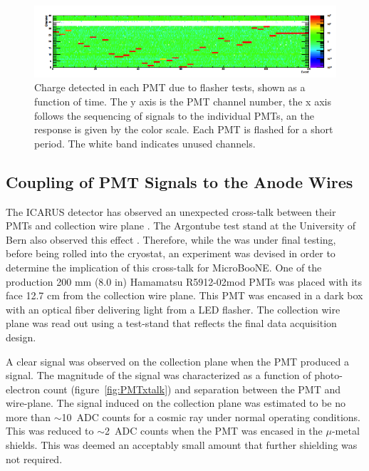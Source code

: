 \begin{figure}
\centering 
\includegraphics[width=\textwidth]{./figures/flasherresult.png}
\caption{Charge detected in each PMT due to flasher tests, shown as a function of time.  The y axis is the PMT channel number, the x axis follows the sequencing of signals to the individual PMTs, an the response is given by the color scale.   Each PMT is flashed for a short period. The white band indicates unused channels. \label{fig:flasherresult}  }
\end{figure}



\subsection{Coupling of PMT Signals to the Anode Wires}


The ICARUS detector has observed an unexpected cross-talk between their PMTs and collection wire plane \cite{Ankowski:2008aa}. The Argontube test stand at the University of Bern also observed this effect \cite{BernPrivate}.   Therefore, while the \lartpc was under final testing, before being rolled into the cryostat, an experiment was devised in order to determine the implication of this cross-talk for MicroBooNE.  One of the production 200 mm (8.0 in) Hamamatsu R5912-02mod PMTs was placed with its face 12.7 cm from the \lartpc collection wire plane. This PMT was encased in a dark box with an optical fiber delivering light from a LED flasher. The collection wire plane was read out using a test-stand that reflects the final data acquisition design.

A clear signal was observed on the collection plane when the PMT produced a signal. The magnitude of the signal was characterized as a function of photo-electron count (figure~\ref{fig:PMTxtalk}) and separation between the PMT and wire-plane. The signal induced on the collection plane was estimated to be no more than $\sim$10~ADC counts for a cosmic ray under normal operating conditions. This was reduced to $\sim$2~ADC counts when the PMT was encased in the $\mu$-metal shields. This was deemed an acceptably small amount that further shielding was not required.

